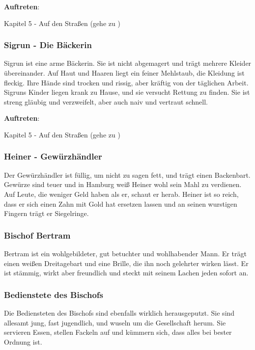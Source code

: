 \textbf{Auftreten}:

Kapitel 5 - Auf den Straßen (gehe zu \blue{\ref{eingeholt}})

\subsubsection*{Sigrun - Die Bäckerin}
\label{Sigrun}

Sigrun ist eine arme Bäckerin. Sie ist nicht abgemagert und trägt mehrere Kleider übereinander. Auf Haut und Haaren liegt ein feiner Mehlstaub, die Kleidung ist fleckig. Ihre Hände sind trocken und rissig, aber kräftig von der täglichen Arbeit. Sigruns Kinder liegen krank zu Hause, und sie versucht Rettung zu finden. Sie ist streng gläubig und verzweifelt, aber auch naiv und vertraut schnell.

\textbf{Auftreten}:

Kapitel 5 - Auf den Straßen (gehe zu \blue{\ref{neingeholt}})

\subsubsection*{Heiner - Gewürzhändler}
\label{Heiner}

Der Gewürzhändler ist füllig, um nicht zu sagen fett, und trägt einen Backenbart. Gewürze sind teuer und in Hamburg weiß Heiner wohl sein Mahl zu verdienen. Auf Leute, die weniger Geld haben als er, schaut er herab. Heiner ist so reich, dass er sich einen Zahn mit Gold hat ersetzen lassen und an seinen wurstigen Fingern trägt er Siegelringe.

\subsubsection*{Bischof Bertram}
\label{Bertram}

Bertram ist ein wohlgebildeter, gut betuchter und wohlhabender Mann. Er trägt einen weißen Dreitagebart und eine Brille, die ihn noch gelehrter wirken lässt. Er ist stämmig, wirkt aber freundlich und steckt mit seinem Lachen jeden sofort an.

\subsubsection*{Bedienstete des Bischofs}
\label{Bischofdiener}

Die Bediensteten des Bischofs sind ebenfalls wirklich herausgeputzt. Sie sind allesamt jung, fast jugendlich, und wuseln um die Gesellschaft herum. Sie servieren Essen, stellen Fackeln auf und kümmern sich, dass alles bei bester Ordnung ist.

